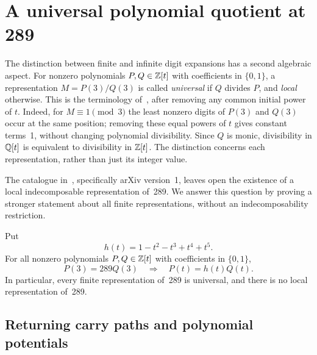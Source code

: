 \section{A universal polynomial quotient at 289}
\label{numerator:section}

The distinction between finite and infinite digit expansions has a second
algebraic aspect. For nonzero polynomials $P,Q\in\mathbb Z[t]$ with coefficients
in $\{0,1\}$, a representation $M=P(3)/Q(3)$ is called
\emph{universal} if $Q$ divides $P$, and \emph{local} otherwise.
This is the terminology of~\cite[Definition~1.1]{ADRS}, after removing
any common initial power of $t$. Indeed, for $M\equiv1\pmod3$ the
least nonzero digits of $P(3)$ and $Q(3)$ occur at the same position;
removing these equal powers of $t$ gives constant terms~1, without
changing polynomial divisibility. Since $Q$ is monic, divisibility
in $\mathbb Q[t]$ is equivalent to divisibility in $\mathbb Z[t]$.
The distinction concerns each representation, rather than just its
integer value.

The catalogue in~\cite[Section~4, pp.~24--25]{ADRS}, specifically
arXiv version~1, leaves open the existence of a local indecomposable
representation of~289. We answer this question by proving a stronger
statement about all finite representations, without an indecomposability
restriction.

\begin{theorem}
\label{numerator:main}
Put
\[
 h(t)=1-t^2-t^3+t^4+t^5.
\]
For all nonzero polynomials $P,Q\in\mathbb Z[t]$ with coefficients in
$\{0,1\}$,
\begin{equation}\label{numerator:eq:universal}
 P(3)=289Q(3)\quad\Longrightarrow\quad P(t)=h(t)Q(t).
\end{equation}
In particular, every finite representation of~289 is universal, and
there is no local representation of~289.
\end{theorem}

\subsection{Returning carry paths and polynomial potentials}

